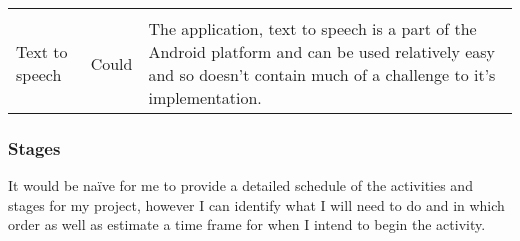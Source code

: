 \begin{longtable}[]{@{}lll@{}}
\begin{minipage}[t]{0.60\columnwidth}
\end{minipage}\tabularnewline
\begin{minipage}[t]{0.22\columnwidth}\raggedright\strut
Text to speech\strut
\end{minipage} & \begin{minipage}[t]{0.10\columnwidth}\raggedright\strut
Could\strut
\end{minipage} & \begin{minipage}[t]{0.60\columnwidth}\raggedright\strut
The application, text to speech is a part of the Android platform and
can be used relatively easy and so doesn't contain much of a challenge
to it's implementation.\strut
\end{minipage}\tabularnewline
\bottomrule
\end{longtable}

\subsubsection{Stages}\label{stages}

It would be naïve for me to provide a detailed schedule of the
activities and stages for my project, however I can identify what I will
need to do and in which order as well as estimate a time frame for when
I intend to begin the activity.

